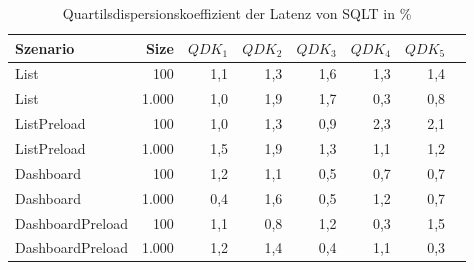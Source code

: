 
\begin{table}[ht]
\setlength{\extrarowheight}{-1pt}
\centering
\caption{Quartilsdispersionskoeffizient der Latenz von SQLT in \%}
\begin{tabular}{lrrrrrrr}
\toprule
Szenario & Size & ${QDK_1}$ & ${QDK_2}$ & ${QDK_3}$& ${QDK_4}$ & ${QDK_5}$ \\
\midrule
	List & 100 & \cellcolor{red!2}  1,1 & \cellcolor{red!2}  1,3 & \cellcolor{red!2}  1,6 & \cellcolor{red!2}  1,3 & \cellcolor{red!2}  1,4 \\
	List & 1.000 & \cellcolor{red!1}  1,0 & \cellcolor{red!2}  1,9 & \cellcolor{red!2}  1,7 & \cellcolor{red!1}  0,3 & \cellcolor{red!1}  0,8 \\
	ListPreload & 100 & \cellcolor{red!2}  1,0 & \cellcolor{red!2}  1,3 & \cellcolor{red!1}  0,9 & \cellcolor{red!3}  2,3 & \cellcolor{red!3}  2,1 \\
	ListPreload & 1.000 & \cellcolor{red!2}  1,5 & \cellcolor{red!2}  1,9 & \cellcolor{red!2}  1,3 & \cellcolor{red!2}  1,1 & \cellcolor{red!2}  1,2 \\
	Dashboard & 100 & \cellcolor{red!2}  1,2 & \cellcolor{red!2}  1,1 & \cellcolor{red!1}  0,5 & \cellcolor{red!1}  0,7 & \cellcolor{red!1}  0,7 \\
	Dashboard & 1.000 & \cellcolor{red!1}  0,4 & \cellcolor{red!2}  1,6 & \cellcolor{red!1}  0,5 & \cellcolor{red!2}  1,2 & \cellcolor{red!1}  0,7 \\
	DashboardPreload & 100 & \cellcolor{red!2}  1,1 & \cellcolor{red!1}  0,8 & \cellcolor{red!2}  1,2 & \cellcolor{red!1}  0,3 & \cellcolor{red!2}  1,5 \\
	DashboardPreload & 1.000 & \cellcolor{red!2}  1,2 & \cellcolor{red!2}  1,4 & \cellcolor{red!1}  0,4 & \cellcolor{red!2}  1,1 & \cellcolor{red!1}  0,3 \\
\bottomrule
\end{tabular}
\label{tab:quartilsdispersionskoeffizient_latenz_sqlt}
\end{table}
	